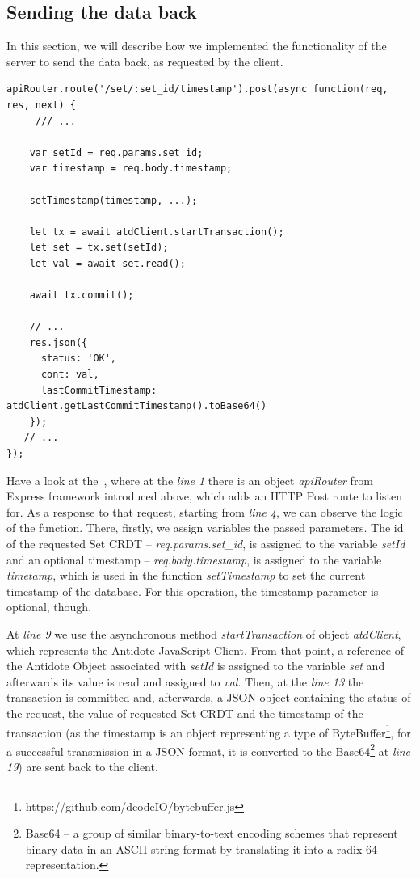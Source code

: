 \subsection*{Sending the data back}

In this section, we will describe how we implemented the functionality of the server to send the data back, as requested by the client.

\begin{lstlisting}[caption={Code for sending back to the client the requested data.}, label={lst:dev1}]
apiRouter.route('/set/:set_id/timestamp').post(async function(req, res, next) {   
     /// ...
    
    var setId = req.params.set_id;
    var timestamp = req.body.timestamp;

    setTimestamp(timestamp, ...);

    let tx = await atdClient.startTransaction();
    let set = tx.set(setId);
    let val = await set.read();

    await tx.commit();

    // ...
    res.json({
      status: 'OK',
      cont: val,
      lastCommitTimestamp: atdClient.getLastCommitTimestamp().toBase64()
    });
   // ... 
});
\end{lstlisting} 

Have a look at the~, where at the \textit{line 1} there is an object \textit{apiRouter} from Express framework introduced above, which adds an HTTP Post route to listen for. As a response to that request, starting from \textit{line 4}, we can observe the logic of the function. There, firstly, we assign variables the passed parameters. The id of the requested Set CRDT -- \textit{req.params.set\_id}, is assigned to the variable \textit{setId} and an optional timestamp -- \textit{req.body.timestamp}, is assigned to the variable \textit{timetamp}, which is used in the function \textit{setTimestamp} to set the current timestamp of the database. For this operation, the timestamp parameter is optional, though.

At \textit{line 9} we use the asynchronous method \textit{startTransaction} of object \textit{atdClient}, which represents the Antidote JavaScript Client. From that point, a reference of the Antidote Object associated with \textit{setId} is assigned to the variable \textit{set} and afterwards its value is read and assigned to \textit{val}. Then, at the \textit{line 13} the transaction is committed and, afterwards, a JSON object containing the status of the request, the value of requested Set CRDT and the timestamp of the transaction (as the timestamp is an object representing a type of ByteBuffer\footnote{https://github.com/dcodeIO/bytebuffer.js}, for a successful transmission in a JSON format, it is converted to the Base64\footnote{Base64 -- a group of similar binary-to-text encoding schemes that represent binary data in an ASCII string format by translating it into a radix-64 representation\cite{53}.} at \textit{line 19}) are sent back to the client.

